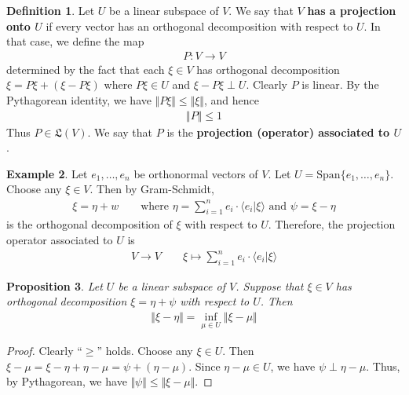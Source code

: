 \documentclass[12pt,b5paper,notitlepage]{article}
\theoremstyle{definition}
\newtheorem{df}{Definition}[subsection]
\newtheorem{eg}[df]{Example}
\theoremstyle{plain}
\newtheorem{pp}[df]{Proposition}
\newcommand{\fk}{\mathfrak}
\newcommand{\Span}{\mathrm{Span}}
\newcommand{\bk}[1]{\langle {#1}\rangle}
\numberwithin{equation}{section}
\begin{document}
\begin{df}\label{lb246}
Let $U$ be a linear subspace of $V$. We say that $V$ \textbf{has a projection onto $U$}  if every vector has an orthogonal decomposition with respect to $U$. In that case, we define the map
\begin{align*}
P:V\rightarrow V
\end{align*}
determined by the fact that each $\xi\in V$ has orthogonal decomposition $\xi=P\xi+(\xi-P\xi)$ where $P\xi\in U$ and $\xi-P\xi\perp U$. Clearly $P$ is linear. By the Pythagorean identity, we have $\Vert P\xi\Vert\leq\Vert \xi\Vert$, and hence 
\begin{align*}
\Vert P\Vert\leq 1
\end{align*} 
Thus $P\in\fk L(V)$. We say that $P$ is the \textbf{projection (operator) associated to $U$}. 
\end{df}


\begin{eg}\label{lb124}
Let $e_1,\dots,e_n$ be orthonormal vectors of $V$. Let $U=\Span\{e_1,\dots,e_n\}$. Choose any $\xi\in V$. Then by Gram-Schmidt,
\begin{align}
\xi=\eta+w\qquad\text{where }\eta=\sum_{i=1}^ne_i\cdot\bk{e_i|\xi}\text{ and }\psi=\xi-\eta
\end{align}
is the orthogonal decomposition of $\xi$ with respect to $U$. Therefore, the projection operator associated to $U$ is 
\begin{align*}
V\rightarrow V\qquad \xi\mapsto\sum_{i=1}^n e_i\cdot\bk{e_i|\xi}
\end{align*}
\end{eg}

\begin{pp}\label{lb120}
Let $U$ be a linear subspace of $V$. Suppose that $\xi\in V$ has orthogonal decomposition $\xi=\eta+\psi$ with respect to $U$. Then
\begin{align}
\Vert \xi-\eta\Vert=\inf_{\mu\in U}\Vert \xi-\mu\Vert
\end{align}
\end{pp}


\begin{proof}
Clearly ``$\geq$'' holds. Choose any $\xi\in U$. Then $\xi-\mu=\xi-\eta+\eta-\mu=\psi+(\eta-\mu)$. Since $\eta-\mu\in U$, we have $\psi\perp \eta-\mu$. Thus, by Pythagorean, we have $\Vert \psi\Vert\leq\Vert \xi-\mu\Vert$.
\end{proof}
\end{document}
